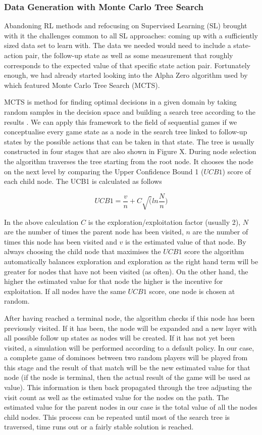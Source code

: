 \documentclass[12pt,a4paper]{article}
\begin{document}
{\subsubsection{Data Generation with Monte Carlo Tree Search}
Abandoning RL methods and refocusing on Supervised Learning (SL) brought with it the challenges common to all SL approaches: coming up with a sufficiently sized data set to learn with. The data we needed would need to include a state-action pair, the follow-up state as well as some measurement that roughly corresponds to the expected value of that specific state action pair. Fortunately enough, we had already started looking into the Alpha Zero algorithm used by \citet{silver_mastering_2017} which featured Monte Carlo Tree Search (MCTS). 

MCTS is method  for finding  optimal  decisions  in  a  given  domain  by taking random samples in the decision space and building a search tree according to the results \citep{browne_survey_2012}. We can apply this framework to the field of sequential games if we conceptualise every game state as a node in the search tree linked to follow-up states by the possible actions that can be taken in that state. The tree is usually constructed in four stages that are also shown in Figure X. During node selection the algorithm traverses the tree starting from the root node. It chooses the node on the next level by comparing the Upper Confidence Bound 1 ($UCB1$) score of each child node. The UCB1 is calculated as follows

$$UCB1 = \frac{v}{n} + C \sqrt(ln \frac{N}{n})$$

In the above calculation $C$ is the exploration/exploitation factor (usually 2), $N$ are the number of times the parent node has been visited, $n$ are the number of times this node has been visited and $v$ is the estimated value of that node. By always choosing the child node that maximises the $UCB1$ score the algorithm automatically balances exploration and exploration as the right hand term will be greater for nodes that have not been visited (as often). On the other hand, the higher the estimated value for that node the higher is the incentive for exploitation. If all nodes have the same $UCB1$ score, one node is chosen at random. 

After having reached a terminal node, the algorithm checks if this node has been previously visited. If it has been, the node will be expanded and a new layer with all possible follow up states as nodes will be created. If it has not yet been visited, a simulation will be performed according to a default policy. In our case, a complete game of dominoes between two random players will be played from this stage and the result of that match will be the new estimated value for that node (if the node is terminal, then the actual result of the game will be used as value). This information is then back propagated through the tree adjusting the visit count as well as the estimated value for the nodes on the path. The estimated value for the parent nodes in our case is the total value of all the nodes child nodes. This process can be repeated until most of the search tree is traversed, time runs out or a fairly stable solution is reached.

}
\end{document}
